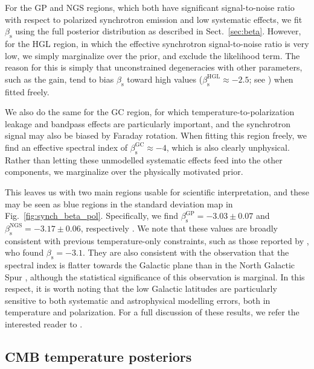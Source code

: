 \documentclass[onecolumn]{aa}
\begin{document}
For the GP and NGS regions, which both have significant
signal-to-noise ratio with respect to polarized synchrotron emission
and low systematic effects, we fit $\beta_{\mathrm{s}}$ using the full
posterior distribution as described in Sect.~\ref{sec:beta}. However,
for the HGL region, in which the effective synchrotron signal-to-noise
ratio is very low, we simply marginalize over the prior, and exclude
the likelihood term. The reason for this is simply that unconstrained
degeneracies with other parameters, such as the gain, tend to bias
$\beta_{\mathrm{s}}$ toward high values
($\beta_{\mathrm{s}}^{\mathrm{HGL}}\approx-2.5$; see \citealp{bp14})
when fitted freely. 

We also do the same for the GC region, for which
temperature-to-polarization leakage and bandpass effects are
particularly important, and the synchrotron signal may also be biased
by Faraday rotation. When fitting this region freely, we find an
effective spectral index of
$\beta_{\mathrm{s}}^{\mathrm{GC}}\approx-4$, which is also clearly
unphysical. Rather than letting these unmodelled systematic effects
feed into the other components, we marginalize over the physically
motivated prior.

This leaves us with two main regions usable for scientific
interpretation, and these may be seen as blue regions in the standard
deviation map in Fig.~\ref{fig:synch_beta_pol}. Specifically, we find
${\beta_{\mathrm{s}}^{\mathrm{GP}}=-3.03\pm0.07}$ and
${\beta_{\mathrm{s}}^{\mathrm{NGS}}=-3.17\pm0.06}$, respectively
\citep{bp14}. We note that these values are broadly consistent with
previous temperature-only constraints, such as those reported by
\citet{planck2014-a12}, who found $\beta_{\mathrm{s}}=-3.1$. They are
also consistent with the observation that the spectral index is
flatter towards the Galactic plane than in the North Galactic Spur
\citep[e.g.,][]{kogut:2012,fuskeland2014,fuskeland:2019}, although the
statistical significance of this observation is marginal. In this
respect, it is worth noting that the low Galactic latitudes are
particularly sensitive to both systematic and astrophysical modelling
errors, both in temperature and polarization.  For a full discussion
of these results, we refer the interested reader to \citet{bp14}.

\subsection{CMB temperature posteriors}
\label{sec:cmb_params}
\end{document}
